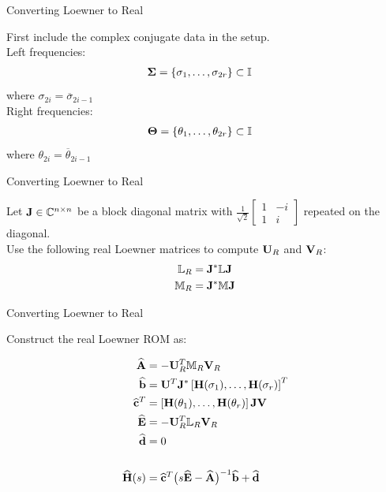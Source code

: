 \begin{frame}{Converting Loewner to Real}

First include the complex conjugate data in the setup.\\
\bigskip
Left frequencies:
\begin{align*}
    {\bf \Sigma} &= \{\sigma_1, \dots, \sigma_{2r}\} \subset \mathbb{I}
\end{align*}
where $\sigma_{2i} = \overline \sigma_{2i-1}$\\
\bigskip
Right frequencies:
\begin{align*}
    {\bf \Theta} &= \{\theta_1, \dots, \theta_{2r}\} \subset \mathbb{I}
\end{align*}
where $\theta_{2i} = \overline \theta_{2i-1}$\\

\end{frame}
\begin{frame}{Converting Loewner to Real}

Let ${\bf J} \in \mathbb{C}^{n \times n}$ be a block diagonal matrix with $\frac{1}{\sqrt 2}\begin{bmatrix} 1 & -i\\ 1 & i\end{bmatrix}$ repeated on the diagonal.\\
\bigskip
Use the following real Loewner matrices to compute ${\bf U}_R$ and ${\bf V}_R$:
\begin{align*}
    \mathbb{L}_R &= {\bf J}^* \mathbb{L} {\bf J}\\
    \mathbb{M}_R &= {\bf J}^* \mathbb{M} {\bf J}\\
\end{align*}


\end{frame}
\begin{frame}{Converting Loewner to Real}

Construct the real Loewner ROM as:

\begin{align*}
    {\bf \widehat{A} } & = -{\bf U}_R^T \mathbb{M}_R {\bf V}_R\\
    {\bf \widehat{b} } & = {\bf U}^T {\bf J}^* \left[{\bf H}(\sigma_1), \dots, {\bf H}(\sigma_r) \right]^T\\
    {\bf \widehat{c}}^T & = \left[{\bf H}(\theta_1), \dots, {\bf H}(\theta_r) \right] {\bf J} {\bf V} \\
    {\bf \widehat{E} } & = -{\bf U}_R^T \mathbb{L}_R {\bf V}_R\\
    {\bf \widehat{d} } & = 0 \\ \\
    {\bf \widehat{H}}(s) & = {\bf \widehat{c}}^T \big( s{\bf \widehat{E}}-{\bf \widehat{A}} \big)^{-1} {\bf \widehat{b}} + {\bf \widehat{d}}
\end{align*}

\end{frame}
